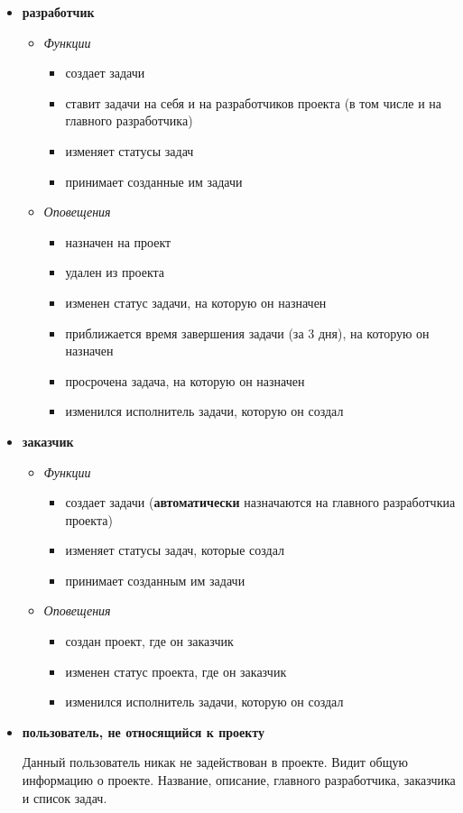 \documentclass[14pt,a4paper]{extarticle}
\begin{document}
\begin{enumerate}
\begin{itemize}
			\item {\bf разработчик}
			\begin{itemize}
				\item {\it Функции}
				\begin{itemize}
					\item создает задачи
					\item ставит задачи на себя и на разработчиков проекта (в том числе и на главного разработчика)
					\item изменяет статусы задач
					\item принимает созданные им задачи
				\end{itemize}
				
				\item {\it Оповещения}
				\begin{itemize}
					\item назначен на проект
					\item удален из проекта
					\item изменен статус задачи, на которую он назначен
					\item приближается время завершения задачи (за 3 дня), на которую он назначен
					\item просрочена задача, на которую он назначен
					\item изменился исполнитель задачи, которую он создал
				\end{itemize}
				
			\end{itemize}
			
			\item {\bf заказчик}
			\begin{itemize}
				\item {\it Функции}
				\begin{itemize}
					\item создает задачи ({\bf автоматически} назначаются на главного разработчкиа проекта)
					\item изменяет статусы задач, которые создал
					\item принимает созданным им задачи
				\end{itemize}
				
				\item {\it Оповещения}
				\begin{itemize}
					\item создан проект, где он заказчик
					\item изменен статус проекта, где он заказчик
					\item изменился исполнитель задачи, которую он создал
				\end{itemize}
				
			\end{itemize}
			
			\item {\bf пользователь, не относящийся к проекту}
			\par Данный пользователь никак не задействован в проекте. Видит общую информацию о проекте. Название, описание, главного разработчика, заказчика и список задач.
		\end{itemize}
	\end{enumerate}
		
\end{document}
